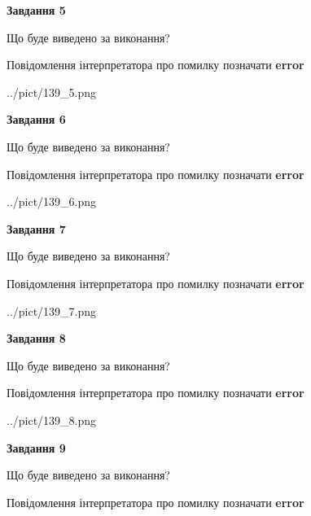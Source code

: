 \documentclass[11pt, ukrainian]{article}
\begin{document}
{\begin {large}
{\begin {center}\textbf{Завдання 5}\end {center}}\par
Що буде виведено за виконання? \par
Повідомлення інтерпретатора про помилку позначати \textbf{error}

\begin{center}
	{../pict/139_5.png}
\end{center}
\newpage

{\begin {center}\textbf{Завдання 6}\end {center}}\par
Що буде виведено за виконання? \par
Повідомлення інтерпретатора про помилку позначати \textbf{error}

\begin{center}
	{../pict/139_6.png}
\end{center}
\newpage

{\begin {center}\textbf{Завдання 7}\end {center}}\par
Що буде виведено за виконання? \par
Повідомлення інтерпретатора про помилку позначати \textbf{error}

\begin{center}
	{../pict/139_7.png}
\end{center}
\newpage

{\begin {center}\textbf{Завдання 8}\end {center}}\par
Що буде виведено за виконання? \par
Повідомлення інтерпретатора про помилку позначати \textbf{error}

\begin{center}
	{../pict/139_8.png}
\end{center}
\newpage

{\begin {center}\textbf{Завдання 9}\end {center}}\par
Що буде виведено за виконання? \par
Повідомлення інтерпретатора про помилку позначати \textbf{error}


\end{large}}
\end{document}
